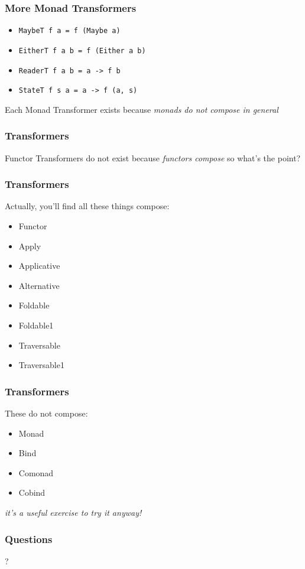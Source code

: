 \begin{frame}[fragile]
\frametitle{More Monad Transformers}
\begin{itemize}
  \item \lstinline $MaybeT f a = f (Maybe a)$
  \item \lstinline $EitherT f a b = f (Either a b)$
  \item \lstinline $ReaderT f a b = a -> f b$
  \item \lstinline $StateT f s a = a -> f (a, s)$
\end{itemize}
\begin{block}{Each Monad Transformer exists}
because \emph{monads do not compose in general}
\end{block}
\end{frame}

\begin{frame}[fragile]
\frametitle{Transformers}
\begin{block}{Functor Transformers do not exist}
because \emph{functors compose} so what's the point?
\end{block}
\end{frame}

\begin{frame}[fragile]
\frametitle{Transformers}
\begin{block}{Actually, you'll find all these things compose:}
\begin{itemize}
\item Functor
\item Apply
\item Applicative
\item Alternative
\item Foldable
\item Foldable1
\item Traversable
\item Traversable1
\end{itemize}
\end{block}
\end{frame}

\begin{frame}[fragile]
\frametitle{Transformers}
\begin{block}{These do not compose:}
\begin{itemize}
\item Monad
\item Bind
\item Comonad
\item Cobind
\end{itemize}
\emph{it's a useful exercise to try it anyway!}
\end{block}
\end{frame}

\begin{frame}[fragile]
\frametitle{Questions}
?
\end{frame}
